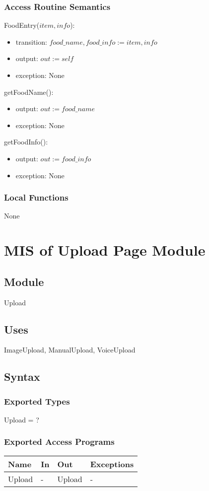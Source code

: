 \documentclass[12pt, titlepage]{article}
\begin{document}
\subsubsection{Access Routine Semantics}
\noindent FoodEntry($item, info$):
\begin{itemize}
	\item transition: $food\_name, food\_info := item, info$
	\item output: $out := self$
	\item exception: None
\end{itemize}
\noindent getFoodName():
\begin{itemize}
	\item output: $out := food\_name$
	\item exception: None
\end{itemize}
\noindent getFoodInfo():
\begin{itemize}
	\item output: $out := food\_info$
	\item exception: None
\end{itemize}
\subsubsection{Local Functions}
None

\newpage

\section{MIS of Upload Page Module}
\subsection{Module}
Upload
\subsection{Uses}
ImageUpload, ManualUpload, VoiceUpload
\subsection{Syntax}
\subsubsection{Exported Types}
Upload = ?
\subsubsection{Exported Access Programs}
\begin{center}
	\begin{tabular}{p{2cm} p{4cm} p{4cm} p{2cm}}
		\hline
		\textbf{Name} & \textbf{In} & \textbf{Out} & \textbf{Exceptions} \\
		\hline
		Upload & - & Upload & - \\
		\hline
	\end{tabular}
\end{center}
\end{document}
